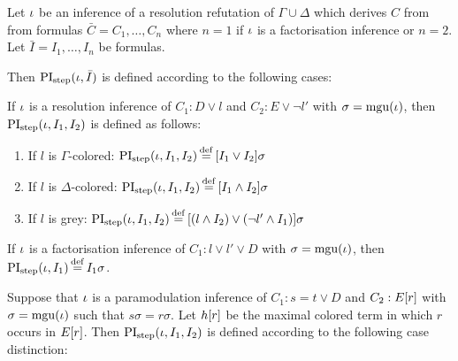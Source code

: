 \begin{defi}[$\PIstep$]
	Let $\iota$ be an inference of a resolution refutation of $\Gamma\cup\Delta$ which derives $C$ from from formulas $\bar C = C_1, \dots, C_n$ where $n=1$  if $\iota$ is a factorisation inference or $n=2$. 
	Let $\bar I = I_1, \dots, I_n$ be formulas.

	Then $\operatorname{PI}_{\mathrm{step}}(\iota, \bar I)$ is defined according to the following cases:

	\begin{indproof}
		\label{def:PI_resolution}
			If $\iota$ is a resolution inference of $C_1: D \lor l$ and $C_2: E \lor \lnot l'$ with $\sigma = \operatorname{mgu}(\iota)$, then $\operatorname{PI}_{\mathrm{step}}(\iota, I_1, I_2)$ is defined as follows:
			\begin{enumerate}
				\item If $l$ is $\Gamma$-colored: $\PIstep(\inference, I_1, I_2) \defeq{} [I_1 \lor I_2]\sigma$
				\item If $l$ is $\Delta$-colored: $\PIstep(\inference, I_1, I_2) \defeq{} [I_1 \land I_2]\sigma$
				\item If $l$ is grey: $\PIstep(\inference, I_1, I_2) \defeq{} [(l \land I_2) \lor (\lnot l' \land I_1) ]\sigma $
			\end{enumerate}

			If $\iota$ is a factorisation inference of $C_1: l \lor l' \lor D$ with $\sigma = \operatorname{mgu}(\iota)$,
			then $\PIstep(\inference, I_1) \defeq I_1\sigma$.

			\label{def:PI_paramod}
			Suppose that $\iota$ is a paramodulation inference of $C_1: s=t \lor D$ and $C_2: E[r]$ 
			with $\sigma = \operatorname{mgu}(\iota)$ such that $s\sigma = r\sigma$.
			Let $h[r]$ be the maximal colored term in which $r$ occurs in $E[r]$.
			Then $\operatorname{PI}_{\mathrm{step}}(\iota, I_1, I_2)$ is defined according to the following case distinction:


\end{indproof}
\end{defi}
